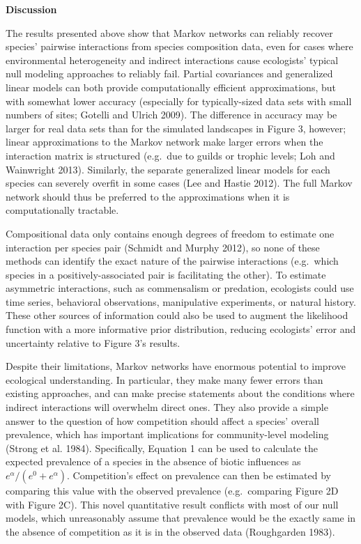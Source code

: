 \documentclass[12pt,]{article}
\begin{document}
\begin{spacing}{1.9}
\begin{flushleft}
\noindent
\textbf{Discussion}

\noindent
The results presented above show that Markov networks can reliably
recover species' pairwise interactions from species composition data,
even for cases where environmental heterogeneity and indirect
interactions cause ecologists' typical null modeling approaches to
reliably fail. Partial covariances and generalized linear models can
both provide computationally efficient approximations, but with somewhat
lower accuracy (especially for typically-sized data sets with small
numbers of sites; Gotelli and Ulrich 2009). The difference in accuracy
may be larger for real data sets than for the simulated landscapes in
Figure 3, however; linear approximations to the Markov network make
larger errors when the interaction matrix is structured (e.g.~due to
guilds or trophic levels; Loh and Wainwright 2013). Similarly, the
separate generalized linear models for each species can severely overfit
in some cases (Lee and Hastie 2012). The full Markov network should thus
be preferred to the approximations when it is computationally tractable.

Compositional data only contains enough degrees of freedom to estimate
one interaction per species pair (Schmidt and Murphy 2012), so none of
these methods can identify the exact nature of the pairwise interactions
(e.g.~which species in a positively-associated pair is facilitating the
other). To estimate asymmetric interactions, such as commensalism or
predation, ecologists could use time series, behavioral observations,
manipulative experiments, or natural history. These other sources of
information could also be used to augment the likelihood function with a
more informative prior distribution, reducing ecologists' error and
uncertainty relative to Figure 3's results.

Despite their limitations, Markov networks have enormous potential to
improve ecological understanding. In particular, they make many fewer
errors than existing approaches, and can make precise statements about
the conditions where indirect interactions will overwhelm direct ones.
They also provide a simple answer to the question of how competition
should affect a species' overall prevalence, which has important
implications for community-level modeling (Strong et al. 1984).
Specifically, Equation 1 can be used to calculate the expected
prevalence of a species in the absence of biotic influences as
\(e^\alpha/(e^{0} + e^\alpha)\). Competition's effect on prevalence can
then be estimated by comparing this value with the observed prevalence
(e.g.~comparing Figure 2D with Figure 2C). This novel quantitative
result conflicts with most of our null models, which unreasonably assume
that prevalence would be the exactly same in the absence of competition
as it is in the observed data (Roughgarden 1983).


\end{flushleft}
\end{spacing}
\end{document}
